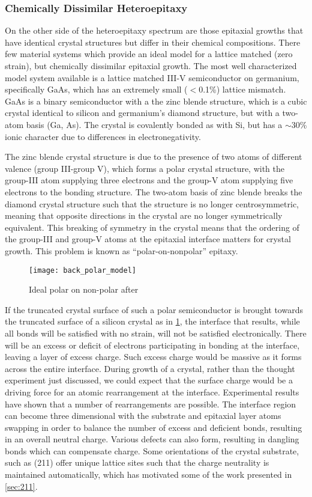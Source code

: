 \subsubsection{Chemically Dissimilar Heteroepitaxy}
On the other side of the heteroepitaxy spectrum are those epitaxial growths that have identical crystal structures but differ in their chemical compositions. There few material systems which provide an ideal model for a lattice matched (zero strain), but chemically dissimilar epitaxial growth. The most well characterized model system available is a lattice matched III-V semiconductor on germanium, specifically GaAs, which has an extremely small ($<$0.1\%) lattice mismatch. GaAs is a binary semiconductor with a the zinc blende structure, which is a cubic crystal identical to silicon and germanium's diamond structure, but with a two-atom basis (Ga, As). The crystal is covalently bonded as with Si, but has a $\sim$30\% ionic character due to differences in electronegativity\cite{Christensen1987}.

The zinc blende crystal structure is due to the presence of two atoms of different valence (group III-group V), which forms a polar crystal structure, with the group-III atom supplying three electrons and the group-V atom supplying five electrons to the bonding structure. The two-atom basis of zinc blende breaks the diamond crystal structure such that the structure is no longer centrosymmetric, meaning that opposite directions in the crystal are no longer symmetrically equivalent. This breaking of symmetry in the crystal means that the ordering of the group-III and group-V atoms at the epitaxial interface matters for crystal growth. This problem is known as ``polar-on-nonpolar'' epitaxy\cite{Biegelsen1992,Kroemer1987}.
\begin{figure}
    \centering
    \texttt{[image: back\_polar\_model]}
    \caption{\label{fig:back_polar_model}Ideal polar on non-polar after \cite{Biegelsen1992}}
\end{figure}

If the truncated crystal surface of such a polar semiconductor is brought towards the truncated surface of a silicon crystal as in \cref{fig:back_polar_model}, the interface that results, while all bonds will be satisfied with no strain, will not be satisfied electronically. There will be an excess or deficit of electrons participating in bonding at the interface, leaving a layer of excess charge. Such excess charge would be massive as it forms across the entire interface. During growth of a crystal, rather than the thought experiment just discussed, we could expect that the surface charge would be a driving force for an atomic rearrangement at the interface. Experimental results have shown that a number of rearrangements are possible. The interface region can become three dimensional with the substrate and epitaxial layer atoms swapping in order to balance the number of excess and deficient bonds, resulting in an overall neutral charge. Various defects can also form, resulting in dangling bonds which can compensate charge. Some orientations of the crystal substrate, such as (211) offer unique lattice sites such that the charge neutrality is maintained automatically, which has motivated some of the work presented in \cref{sec:211}.

